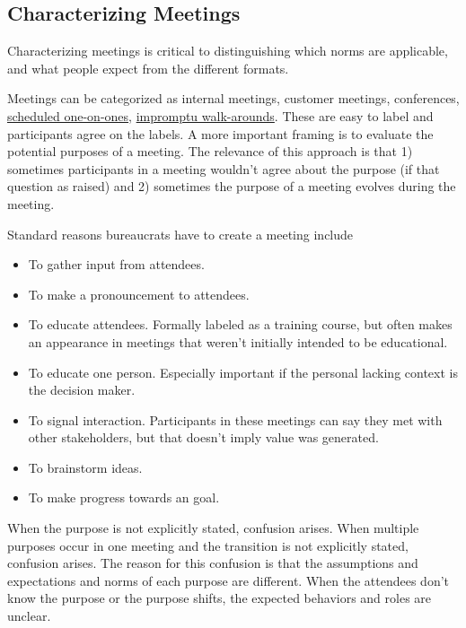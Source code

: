\subsection*{Characterizing Meetings\label{sec:characterizing-meetings}}
Characterizing meetings is critical to distinguishing which norms are applicable, and what people expect from the different formats. 


Meetings can be categorized as internal meetings, customer meetings, conferences, \hyperref[sec:meetings-one-on-one]{scheduled one-on-ones},
\hyperref[sec:walk-arounds]{impromptu walk-arounds}. These are easy to label and participants agree on the labels.
A more important framing is to evaluate the potential purposes of a meeting. The relevance of this approach is that 1) sometimes participants in a meeting wouldn't agree about the purpose (if that question as raised) and 2) sometimes the purpose of a meeting evolves during the meeting. 

Standard reasons bureaucrats have to create a meeting include
\begin{itemize}
    \item To gather input from attendees.
    \item To make a pronouncement to attendees.
    \item To educate attendees. Formally labeled as a training course, but often makes an appearance in meetings that weren't initially intended to be educational. 
    \item To educate one person. Especially important if the personal lacking context is the decision maker. 
    \item To signal interaction. Participants in these meetings can say they met with other stakeholders, but that doesn't imply value was generated. 
    \item To brainstorm ideas.
    \item To make progress towards an goal.
\end{itemize}
When the purpose is not explicitly stated, confusion arises. 
When multiple purposes occur in one meeting and the transition is not explicitly stated, confusion arises.
The reason for this confusion is that the assumptions and expectations and norms of each purpose are different. When the attendees don't know the purpose or the purpose shifts, the expected behaviors and roles are unclear. 

